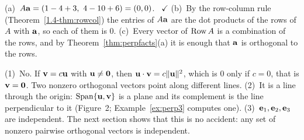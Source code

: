 \documentclass[11pt]{article}
\begin{document}
\begin{description}[leftmargin=0pt,itemsep=5pt]
  \item[Pause and think \ref{think:rowperp}.] (a)~$A\bv{a}=(1-4+3,\ 4-10+6)=(0,0)$. \ $\checkmark$ (b)~By the row-column rule (Theorem~\ref{1.4-thm:rowcol}) the entries of $A\mathbf{a}$ are the dot products of the rows of $A$ with $\mathbf{a}$, so each of them is $0$. (c)~Every vector of $\operatorname{Row} A$ is a combination of the rows, and by Theorem~\ref{thm:perpfacts}(a) it is enough that $\mathbf{a}$ is orthogonal to the rows.
  \item[Questions to think about.] (1)~No. If $\mathbf{v}=c\mathbf{u}$ with $\mathbf{u}\neq\mathbf{0}$, then $\mathbf{u}\cdot\mathbf{v}=c\lVert\mathbf{u}\rVert^2$, which is $0$ only if $c=0$, that is $\mathbf{v}=\mathbf{0}$. Two nonzero orthogonal vectors point along different lines. (2)~It is a line through the origin: $\operatorname{Span}\{\mathbf{u},\mathbf{v}\}$ is a plane and its complement is the line perpendicular to it (Figure~2; Example~\ref{ex:perp3} computes one). (3)~$\mathbf{e}_1,\mathbf{e}_2,\mathbf{e}_3$ are independent. The next section shows that this is no accident: any set of nonzero pairwise orthogonal vectors is independent.
\end{description}
\end{document}

